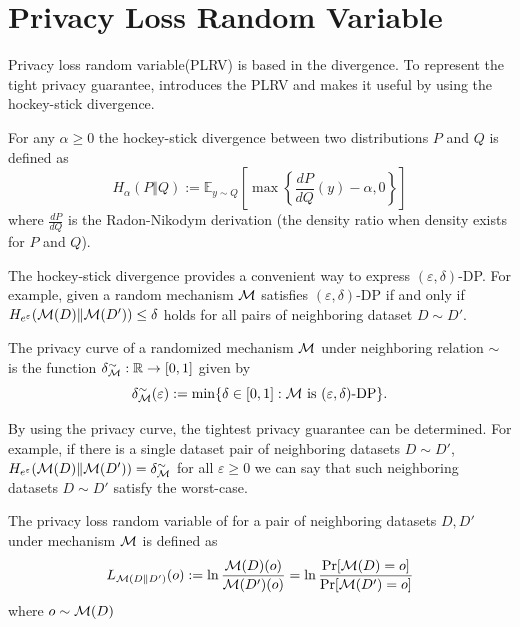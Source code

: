 \documentclass{article}
\begin{document}
\section{Privacy Loss Random Variable}
Privacy loss random variable(PLRV) is based in the divergence. To represent the tight privacy guarantee, \cite{dwork2016concentrated} introduces the PLRV and \cite{sommer2018privacy} makes it useful by using the hockey-stick divergence.
\begin{definition}\label{HSdivergence}
For any $\alpha \ge 0$ the hockey-stick divergence between two distributions $P$ and $Q$ is defined as 
\begin{equation}
    H_\alpha (P \Vert Q) := \mathbb{E}_{y \sim Q} \left[\max \left\{ \frac{dP}{dQ}(y) - \alpha, 0 \right\} \right] 
\end{equation}
where $\frac{dP}{dQ}$ is the Radon-Nikodym derivation (the density ratio when density exists for $P$ and $Q$).
\end{definition}

The hockey-stick divergence provides a convenient way to express $(\varepsilon,\delta)$-DP. For example, given a random mechanism ${\mathcal{M}}$ satisfies $(\varepsilon,\delta)$-DP if and only if $H_{e^\varepsilon} ({\mathcal{M}}(D) \Vert {\mathcal{M}} (D')) \le \delta$ holds for all pairs of neighboring dataset $D\sim D'$.

\begin{definition}
The privacy curve of a randomized mechanism ${\mathcal{M}}$ under neighboring relation $\sim$ is the function $\delta_{\mathcal{M}} ^\sim : {\mathbb{R}} \to [0,1]$ given by
\begin{equation}
    \delta_{\mathcal{M}} ^\sim(\varepsilon) := \min \{ \delta \in [0,1] : \text{${\mathcal{M}}$ is $(\varepsilon,\delta)$-DP\}}.
\end{equation}
\end{definition}

By using the privacy curve, the tightest privacy guarantee can be determined. For example, if there is a single dataset pair of neighboring datasets $D \sim D'$, $H_{e^\varepsilon} ({\mathcal{M}}(D) \Vert {\mathcal{M}} (D')) = \delta_{\mathcal{M}}^\sim$ for all $\varepsilon \ge 0$ we can say that such neighboring datasets $D \sim D'$ satisfy the worst-case.

\begin{definition}\label{PLRV}
The privacy loss random variable of for a pair of neighboring datasets $D, D'$ under mechanism ${\mathcal{M}}$ is defined as
\begin{equation}
    L_{{\mathcal{M}} (D\Vert D')}(o) := \ln \frac{{\mathcal{M}} (D)(o)}{{\mathcal{M}} (D')(o)} = \ln \frac{\Pr[{\mathcal{M}}(D) =o]}{\Pr[{\mathcal{M}}(D') = o]}
\end{equation}
where $o \sim {\mathcal{M}} (D)$
\end{definition}
\end{document}
